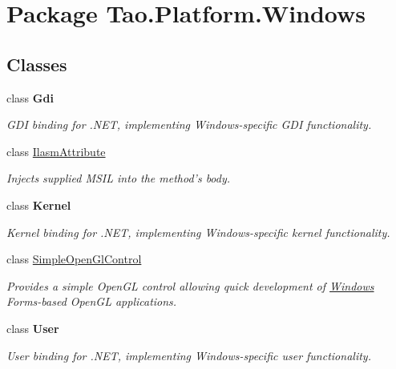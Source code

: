 \hypertarget{namespace_tao_1_1_platform_1_1_windows}{
\section{Package Tao.Platform.Windows}
\label{namespace_tao_1_1_platform_1_1_windows}
}
\subsection*{Classes}
\begin{DoxyCompactItemize}
\item 
class {\bfseries Gdi}
\begin{DoxyCompactList}\small\item\em GDI binding for .NET, implementing Windows-\/specific GDI functionality. \item\end{DoxyCompactList}\item 
class \hyperlink{class_tao_1_1_platform_1_1_windows_1_1_ilasm_attribute}{IlasmAttribute}
\begin{DoxyCompactList}\small\item\em Injects supplied MSIL into the method's body. \item\end{DoxyCompactList}\item 
class {\bfseries Kernel}
\begin{DoxyCompactList}\small\item\em Kernel binding for .NET, implementing Windows-\/specific kernel functionality. \item\end{DoxyCompactList}\item 
class \hyperlink{class_tao_1_1_platform_1_1_windows_1_1_simple_open_gl_control}{SimpleOpenGlControl}
\begin{DoxyCompactList}\small\item\em Provides a simple OpenGL control allowing quick development of \hyperlink{namespace_tao_1_1_platform_1_1_windows}{Windows} Forms-\/based OpenGL applications. \item\end{DoxyCompactList}\item 
class {\bfseries User}
\begin{DoxyCompactList}\small\item\em User binding for .NET, implementing Windows-\/specific user functionality. \item\end{DoxyCompactList}\item 

\end{DoxyCompactItemize}
